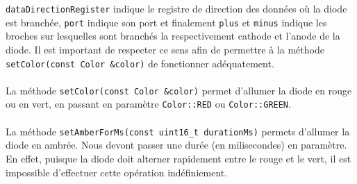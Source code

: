 \documentclass[12pt]{scrartcl}
\begin{document}
\texttt{dataDirectionRegister} indique le registre de direction des données où la
diode est branchée, \texttt{port} indique son port et finalement \texttt{plus}
et \texttt{minus} indique les broches sur lesquelles sont branchés la
respectivement cathode et l'anode de la diode. Il est important de respecter ce
sens afin de permettre à la méthode \texttt{setColor(const Color &color)} de
fonctionner adéquatement.
\\ \\
La méthode \texttt{setColor(const Color &color)} permet d'allumer la diode en rouge
ou en vert, en passant en paramètre \texttt{Color::RED} ou \texttt{Color::GREEN}.
\\ \\
La méthode \texttt{setAmberForMs(const uint16_t durationMs)} permets d'allumer la
diode en ambrée. Nous devont passer une durée (en milisecondes) en paramètre. En
effet, puisque la diode doit alterner rapidement entre le rouge et le vert, il
est impossible d'effectuer cette opération indéfiniement.
\end{document}
